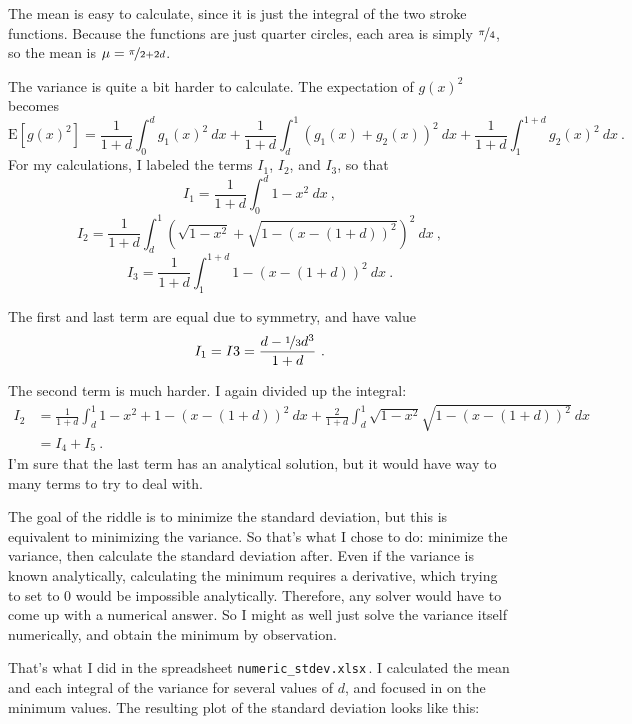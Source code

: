 \documentclass{article}
\begin{document}
The mean is easy to calculate, since it is just the integral of the two stroke functions.
Because the functions are just quarter circles, each area is simply $\nicefrac{\pi}{4}$, so the mean is $\mu=\nicefrac{\pi}{2+2d}$.

The variance is quite a bit harder to calculate.
The expectation of $g(x)^{2}$ becomes
\[
\text{E}\left[g(x)^{2}\right]=\frac{1}{1+d}\int_{0}^{d}g_{1}(x)^{2}\ dx
+\frac{1}{1+d}\int_{d}^{1}\left(g_{1}(x)+g_{2}(x)\right)^{2}\ dx
+\frac{1}{1+d}\int_{1}^{1+d}g_{2}(x)^{2}\ dx\ .
\]
For my calculations, I labeled the terms $I_{1}$, $I_{2}$, and $I_{3}$, so that
\[
I_{1}=\frac{1}{1+d}\int_{0}^{d}1-x^{2}\ dx\ ,
\]
\[
I_{2}=\frac{1}{1+d}\int_{d}^{1}\left(\sqrt{1-x^{2}}+\sqrt{1-(x-(1+d))^{2}}\right)^2\ dx\ ,
\]
\[
I_{3}=\frac{1}{1+d}\int_{1}^{1+d}1-(x-(1+d))^{2}\ dx\ .
\]

The first and last term are equal due to symmetry, and have value
\[
I_{1}=I{3}=\frac{d-\nicefrac{1}{3}d^{3}}{1+d}\ .
\]

The second term is much harder.
I again divided up the integral:
\begin{align*}
I_{2} &=\frac{1}{1+d}\int_{d}^{1}1-x^{2}+1-(x-(1+d))^{2}\ dx
+\frac{2}{1+d}\int_{d}^{1}\sqrt{1-x^{2}}\sqrt{1-(x-(1+d))^{2}}\ dx \\
&=I_{4}+I_{5}\ .
\end{align*}
I'm sure that the last term has an analytical solution, but it would have way to many terms to try to deal with.

The goal of the riddle is to minimize the standard deviation, but this is equivalent to minimizing the variance.
So that's what I chose to do: minimize the variance, then calculate the standard deviation after.
Even if the variance is known analytically, calculating the minimum requires a derivative, which trying to set to 0 would be impossible analytically.
Therefore, any solver would have to come up with a numerical answer.
So I might as well just solve the variance itself numerically, and obtain the minimum by observation.

\vspace{0.5in}

That's what I did in the spreadsheet \texttt{numeric\_stdev.xlsx}\,.
I calculated the mean and each integral of the variance for several values of $d$, and focused in on the minimum values.
The resulting plot of the standard deviation looks like this:
\end{document}
